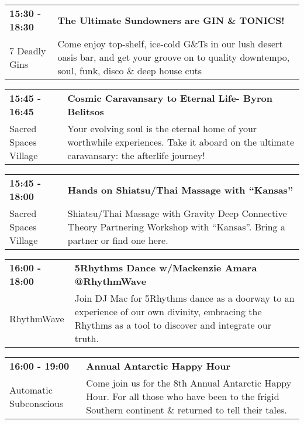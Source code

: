 \begin{tabular}{ p{1in} p{2.2in} }
    \textbf{15:30 - 18:30} & \textbf{The Ultimate Sundowners are GIN \& TONICS!} \\
    7 Deadly Gins \newline  & Come enjoy top-shelf, ice-cold G\&Ts in our lush desert oasis bar, and get your groove on to quality downtempo, soul, funk, disco \& deep house cuts \\
    \hline 
\end{tabular}
    
\begin{tabular}{ p{1in} p{2.2in} }
    \textbf{15:45 - 16:45} & \textbf{Cosmic Caravansary to Eternal Life- Byron Belitsos} \\
    Sacred Spaces Village \newline  & Your evolving soul is the eternal home of your worthwhile experiences. Take it aboard on the ultimate caravansary: the afterlife journey! \\
    \hline 
\end{tabular}
    
\begin{tabular}{ p{1in} p{2.2in} }
    \textbf{15:45 - 18:00} & \textbf{Hands on Shiatsu/Thai Massage with ``Kansas''} \\
    Sacred Spaces Village \newline  & Shiatsu/Thai Massage with Gravity Deep Connective Theory Partnering Workshop with ``Kansas''. Bring a partner or find one here. \\
    \hline 
\end{tabular}
    
\begin{tabular}{ p{1in} p{2.2in} }
    \textbf{16:00 - 18:00} & \textbf{5Rhythms Dance w/Mackenzie Amara @RhythmWave} \\
    RhythmWave \newline  & Join DJ Mac for 5Rhythms dance as a doorway to an experience of our own divinity, embracing the Rhythms as a tool to discover and integrate our truth. \\
    \hline 
\end{tabular}
    
\begin{tabular}{ p{1in} p{2.2in} }
    \textbf{16:00 - 19:00} & \textbf{Annual Antarctic Happy Hour} \\
    Automatic Subconscious \newline  & Come join us for the 8th Annual Antarctic Happy Hour. For all those who have been to the frigid Southern continent \& returned to tell their tales. \\
    \hline 
\end{tabular}
    
